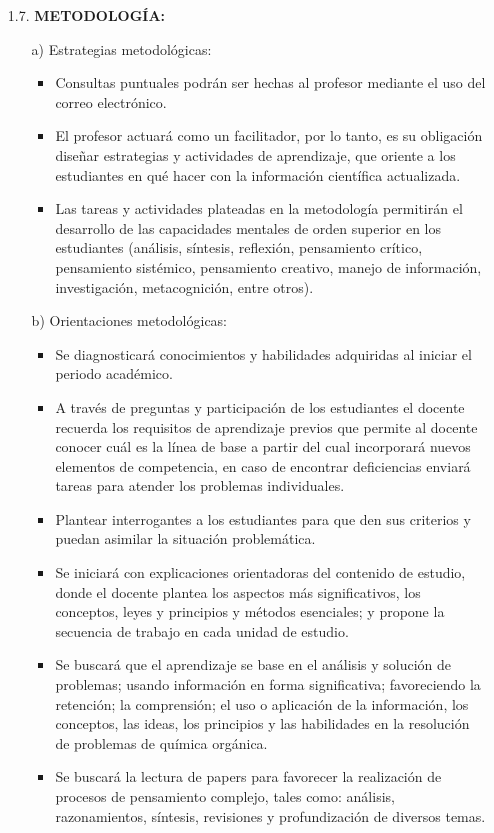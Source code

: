 \documentclass[10pt,a4paper]{article}
\begin{document}
\begin{enumerate}
\item[1.7.]	{\bf METODOLOGÍA:}
\begin{enumerate}
\item[a)] Estrategias metodológicas:
\begin{itemize}
\item	Consultas puntuales podrán ser hechas al profesor mediante el uso del correo electrónico.
\item	El profesor actuará como un facilitador, por lo tanto, es su obligación diseñar estrategias y actividades de aprendizaje, que oriente a los estudiantes en qué hacer con la información científica actualizada. 
\item	Las tareas y actividades plateadas en la metodología permitirán el desarrollo de las capacidades mentales de orden superior en los estudiantes (análisis, síntesis, reflexión, pensamiento crítico, pensamiento sistémico, pensamiento creativo, manejo de información, investigación, metacognición, entre otros).\\
\end{itemize}
\item[b)]	Orientaciones metodológicas:\\
\begin{itemize}
\item	Se  diagnosticará conocimientos y habilidades adquiridas al iniciar el periodo académico.
\item	A través de preguntas y participación de los estudiantes el docente recuerda los requisitos de aprendizaje previos que permite al docente conocer cuál es la línea de base a partir del cual incorporará nuevos elementos de competencia, en caso de encontrar deficiencias enviará tareas para atender los problemas individuales.
\item	Plantear interrogantes a los estudiantes para que den sus criterios y puedan asimilar la situación problemática. 
\item	Se iniciará con explicaciones orientadoras del contenido de estudio, donde el docente plantea los aspectos más significativos, los conceptos, leyes y principios y métodos esenciales; y propone la secuencia de trabajo en cada unidad de estudio.
\item	Se buscará que el aprendizaje se base en el análisis y solución de problemas; usando información en forma significativa; favoreciendo la retención; la comprensión; el uso o aplicación de la información, los conceptos, las ideas, los principios y las habilidades en la resolución de problemas de química orgánica.
\item	Se buscará la lectura de papers para favorecer la realización de procesos de pensamiento complejo, tales como: análisis, razonamientos, síntesis, revisiones y profundización de diversos temas.

\end{itemize}
\end{enumerate}
\end{enumerate}
\end{document}
